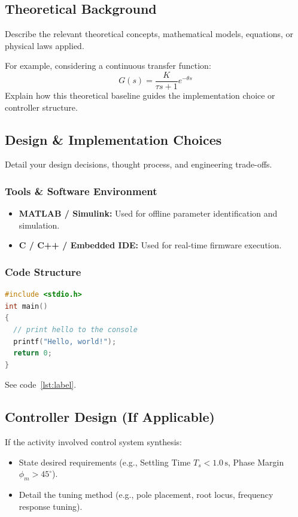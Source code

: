 \documentclass[english]{article}
\begin{document}
\subsection{Theoretical Background}
Describe the relevant theoretical concepts, mathematical models, equations, or physical laws applied.

For example, considering a continuous transfer function:
\begin{equation}
  G(s) = \frac{K}{\tau s + 1} e^{-\theta s}
\end{equation}
Explain how this theoretical baseline guides the implementation choice or controller structure.

\subsection{Design \& Implementation Choices}

Detail your design decisions, thought process, and engineering trade-offs.

\subsubsection{Tools \& Software Environment}

\begin{itemize}
  \item \textbf{MATLAB / Simulink:} Used for offline parameter identification and simulation.
  \item \textbf{C / C++ / Embedded IDE:} Used for real-time firmware execution.
\end{itemize}

\subsubsection{Code Structure}

\begin{lstlisting}[language=C, caption={C code using listings}, label={lst:label} ]
#include <stdio.h>
int main()
{
  // print hello to the console
  printf("Hello, world!");
  return 0;
}
\end{lstlisting}

See code~\ref{lst:label}.

\subsection{Controller Design (If Applicable)}

If the activity involved control system synthesis:
\begin{itemize}
  \item State desired requirements (e.g., Settling Time $T_s < 1.0\,\text{s}$, Phase Margin $\phi_m > 45^\circ$).
  \item Detail the tuning method (e.g., pole placement, root locus, frequency response tuning).
\end{itemize}
\end{document}
